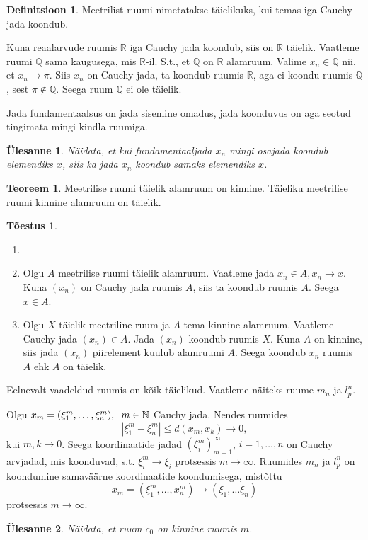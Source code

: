 \documentclass{article}[12pt]
\newcommand{\h}{\hspace{0.2cm}}
\newcommand{\R}{\mathbb{R}}
\newcommand{\N}{\mathbb{N}}
\newcommand{\Q}{\mathbb{Q}}
\newtheorem{yl}{Ülesanne}[section]
\theoremstyle{definition}
\newtheorem{definition}{Definitsioon}[section]
\theoremstyle{definition}
\newtheorem{theorem}{Teoreem}[section]
\theoremstyle{definition}
\theoremstyle{break}
\newtheorem*{toestus}{Tõestus}
\begin{document}
\begin{definition}
	Meetrilist ruumi nimetatakse täielikuks, kui temas iga Cauchy jada koondub.
\end{definition}

Kuna reaalarvude ruumis $\R$ iga Cauchy jada koondub, siis on $\R$ täielik.
Vaatleme ruumi $\Q$ sama kaugusega, mis $\R$-il.
S.t., et $\Q$ on $\R$ alamruum.
Valime $x_n\in \Q$ nii, et $x_n\rightarrow \pi$.
Siis $x_n$ on Cauchy jada, ta koondub ruumis $\R$, aga ei koondu ruumis $\Q$, sest $\pi\notin \Q$. Seega ruum $\Q$ ei ole täielik.

Jada fundamentaalsus on jada sisemine omadus, jada koonduvus on aga seotud tingimata mingi kindla ruumiga.

\begin{yl}
	Näidata, et kui fundamentaaljada $x_n$ mingi osajada koondub elemendiks $x$, siis ka jada $x_n$ koondub samaks elemendiks $x$.
\end{yl}

\begin{theorem}
	Meetrilise ruumi täielik alamruum on kinnine. 
	Täieliku meetrilise ruumi kinnine alamruum on täielik.
\end{theorem}


\begin{toestus}
	\begin{enumerate}
		\item[]
		\item Olgu $A$ meetrilise ruumi täielik alamruum.
		Vaatleme jada $x_n\in A,x_n\rightarrow x$.
		Kuna $(x_n)$ on Cauchy jada ruumis $A$, siis ta koondub ruumis $A$.
		Seega $x\in A$.
		\item Olgu $X$ täielik meetriline ruum ja $A$ tema kinnine alamruum.
		Vaatleme Cauchy jada $(x_n)\in A$.
		Jada $(x_n)$ koondub ruumis $X$.
		Kuna $A$ on kinnine, siis jada $(x_n)$ piirelement kuulub alamruumi $A$.
		Seega koondub $x_n$ ruumis $A$ ehk $A$ on täielik.
	\end{enumerate}
\end{toestus}

Eelnevalt vaadeldud ruumis on kõik täielikud.
Vaatleme näiteks ruume $m_n$ ja $l_p^n$.

Olgu $x_m=(\xi_1^m,\dots,\xi_n^m),\h m\in\N$ Cauchy jada.
Nendes ruumides
\[
	|\xi_1^m-\xi_n^m|\leq d(x_m,x_k) \rightarrow 0,
\]
kui $m,k\rightarrow 0$.
Seega koordinaatide jadad $(\xi_i^m)_{m=1}^\infty$, $i=1,\dots,n$ on Cauchy arvjadad, mis koonduvad, s.t. $\xi_i^m\rightarrow\xi_i$ protsessis $m\rightarrow\infty$.
Ruumides $m_n$ ja $l_p^n$ on koondumine samaväärne koordinaatide koondumisega, mistõttu 
\[
	x_m = (\xi_1^m,\dots,x_n^m) \rightarrow (\xi_1,\dots \xi_n)
\]
protsessis $m\rightarrow \infty$.

\begin{yl}
	Näidata, et ruum $c_0$ on kinnine ruumis $m$.
\end{yl}
\end{document}
